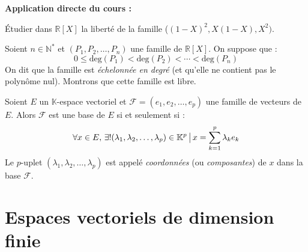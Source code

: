 \documentclass[french,11pt,twoside]{VcCours}
\newenvironment{ApplicationDirecte}{\textbf{Application directe du cours :}

}{}
\begin{document}
\begin{ApplicationDirecte} Étudier dans $\mathbb{R}[X]$ la liberté de la famille ($(1-X)^2,X(1-X),X^2)$.
\end{ApplicationDirecte}
\begin{Exemple} Soient $n \in \mathbb{N}^*$ et $(P_1, P_2, \ldots, P_n)$ une famille de $\mathbb{R}[X]$. On suppose que :
$$ 0 \leq \textrm{deg}(P_1) < \textrm{deg}(P_2) < \cdots < \textrm{deg}(P_n)$$
On dit que la famille est \emph{échelonnée en degré} (et qu'elle ne contient pas le polynôme nul). Montrons que cette famille est libre.

\medskip
%
%

\vspace{9cm}

\end{Exemple}

\begin{TheoremeDefinition}{} 
Soient $E$ un $\mathbb{K}$-espace vectoriel et $\mathcal{F} = (e_1, e_2, \ldots, e_p)$ une famille de vecteurs de $E$. Alors $\mathcal{F}$ est une base de $E$ si et seulement si :
$$ \forall x \in E, \, \exists  ! (\lambda_1, \lambda_2, \ldots, \lambda_p) \in \mathbb{K}^p \, \big{\vert} \, x = \sum_{k=1}^p \lambda_k e_k$$
Le $p$-uplet $(\lambda_1, \lambda_2, \ldots, \lambda_p)$ est appelé \emph{coordonnées} (ou \emph{composantes}) de $x$ dans la base $\mathcal{F}$.
\end{TheoremeDefinition}

\section{Espaces vectoriels de dimension finie}
\end{document}
